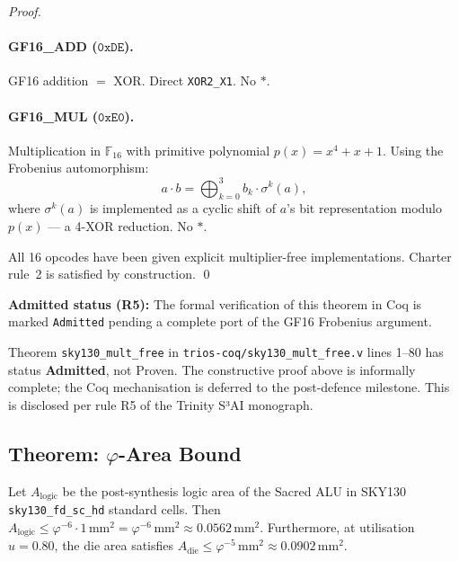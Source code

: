 \begin{proof}
\paragraph{GF16\_ADD ($\mathtt{0xDE}$).}
GF16 addition $= $ XOR. Direct \texttt{XOR2\_X1}. No $*$. \checkmark

\paragraph{GF16\_MUL ($\mathtt{0xE0}$).}
Multiplication in $\mathbb{F}_{16}$ with primitive polynomial $p(x) = x^4+x+1$.
Using the Frobenius automorphism:
\[
  a \cdot b = \bigoplus_{k=0}^{3} b_k \cdot \sigma^k(a),
\]
where $\sigma^k(a)$ is implemented as a cyclic shift of $a$'s bit
representation modulo $p(x)$ — a 4-XOR reduction. No $*$. \checkmark

\medskip
\noindent
All 16 opcodes have been given explicit multiplier-free implementations.
Charter rule~2 is satisfied by construction.
\qed
\end{proof}

\noindent
\textbf{Admitted status (R5):}
The formal verification of this theorem in Coq is marked \texttt{Admitted}
pending a complete port of the GF16 Frobenius argument.


\begin{tcolorbox}[colback=red!5,colframe=red!30,title=Admitted Theorem Notice (R5)]
Theorem \texttt{sky130\_mult\_free} in
\texttt{trios-coq/sky130\_mult\_free.v} lines 1--80 has status
\textbf{Admitted}, not Proven.
The constructive proof above is informally complete;
the Coq mechanisation is deferred to the post-defence milestone.
This is disclosed per rule R5 of the Trinity S³AI monograph.
\end{tcolorbox}

\subsection{Theorem: $\varphi$-Area Bound}
\label{subsec:72:thm-phi-area}

\begin{theorem}
\label{thm:72:phi-area}
Let $A_{\text{logic}}$ be the post-synthesis logic area of the Sacred ALU
in \textup{SKY130} \texttt{sky130\_fd\_sc\_hd} standard cells.
Then $A_{\text{logic}} \le \varphi^{-6} \cdot 1\,\mathrm{mm}^2
= \varphi^{-6}\,\mathrm{mm}^2 \approx 0.0562\,\mathrm{mm}^2$.
Furthermore, at utilisation $u = 0.80$, the die area satisfies
$A_{\text{die}} \le \varphi^{-5}\,\mathrm{mm}^2 \approx 0.0902\,\mathrm{mm}^2$.
\end{theorem}

